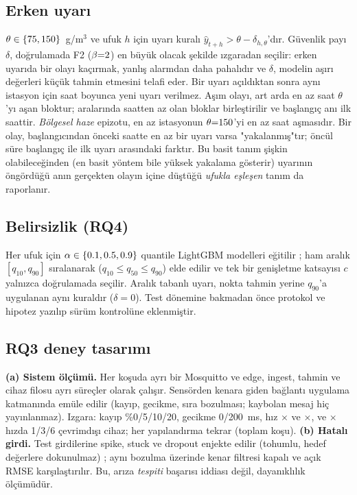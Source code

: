 \documentclass[conference]{IEEEtran}
\newcommand{\ugm}{\textmu g/m$^3$}
\begin{document}
\subsection{Erken uyarı}
$\theta\in\{75{},150{}\}$~\ugm{} ve ufuk $h$ için uyarı kuralı $\hat y_{t+h}>\theta-\delta_{h,\theta}$'dır. Güvenlik payı $\delta$, doğrulamada F2 ($\beta{=}2{}$) en büyük olacak şekilde ızgaradan seçilir: erken uyarıda bir olayı kaçırmak, yanlış alarmdan daha pahalıdır ve $\delta$, modelin aşırı değerleri küçük tahmin etmesini telafi eder. Bir uyarı açıldıktan sonra aynı istasyon için \nCooldownH{} saat boyunca yeni uyarı verilmez. Aşım olayı, art arda en az \nEventMinHours{} saat $\theta$'yı aşan bloktur; aralarında \nEventMergeGapH{} saatten az olan bloklar birleştirilir ve başlangıç anı ilk saattir. \emph{Bölgesel haze} epizotu, en az \nHazeMinStations{} istasyonun $\theta{=}150{}$'yi en az \nHazeMinHours{} saat aşmasıdır. Bir olay, başlangıcından önceki \nWarnWindowH{} saatte en az bir uyarı varsa "yakalanmış"tır; öncül süre başlangıç ile ilk uyarı arasındaki farktır. Bu basit tanım şişkin olabileceğinden (en basit yöntem bile yüksek yakalama gösterir) uyarının öngördüğü anın gerçekten olayın içine düştüğü \emph{ufukla eşleşen} tanım da raporlanır.

\subsection{Belirsizlik (RQ4)}
Her ufuk için $\alpha\in\{0.1{},0.5{},0.9{}\}$ quantile LightGBM modelleri eğitilir \cite{R27}; ham aralık $[q_{10},q_{90}]$ sıralanarak ($q_{10}\le q_{50}\le q_{90}$) elde edilir ve tek bir genişletme katsayısı $c$ yalnızca doğrulamada seçilir. Aralık tabanlı uyarı, nokta tahmin yerine $q_{90}$'a uygulanan aynı kuraldır ($\delta{=}0$). Test dönemine bakmadan önce protokol ve hipotez yazılıp sürüm kontrolüne eklenmiştir.

\subsection{RQ3 deney tasarımı}
\textbf{(a) Sistem ölçümü.} Her koşuda ayrı bir Mosquitto ve edge, ingest, tahmin ve cihaz filosu ayrı süreçler olarak çalışır. Sensörden kenara giden bağlantı uygulama katmanında emüle edilir (kayıp, gecikme, sıra bozulması; kaybolan mesaj hiç yayınlanmaz). Izgara: kayıp \%0/5/10/20, gecikme 0/200~ms, hız \nSpeedSlow{}$\times$ ve \nSpeedFast{}$\times$, ve \nSpeedFast{}$\times$ hızda 1/3/6 çevrimdışı cihaz; her yapılandırma \nReps{} tekrar (toplam \nRunsTotal{} koşu). \textbf{(b) Hatalı girdi.} Test girdilerine spike, stuck ve dropout enjekte edilir (tohumlu, hedef değerlere dokunulmaz) \cite{R21,R22}; aynı bozulma üzerinde kenar filtresi kapalı ve açık RMSE karşılaştırılır. Bu, arıza \emph{tespiti} başarısı iddiası değil, dayanıklılık ölçümüdür.
\end{document}
